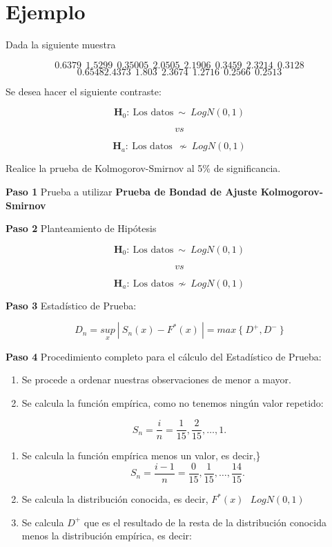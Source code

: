 \documentclass[
  a4paper,
  oneside,
  openany]{book}
\begin{document}
\hypertarget{ejemplo-14}{%
\section{Ejemplo}\label{ejemplo-14}}

Dada la siguiente muestra

\[0.6379 \ \ 1.5299 \ \ 0.35005 \ \ 2.0505 \ \ 2.1906 \ \ 0.3459 \ \ 2.3214 \ \ 0.3128\]
\[ 0.65482.4373 \ \ 1.803 \ \ 2.3674 \ \ 1.2716 \ \ 0.2566 \ \ 0.2513\]

Se desea hacer el siguiente contraste:

\[\textbf{H}_0: \ \mbox{Los datos} \  \sim  \ LogN(0,1)\]

\[vs\]

\[\textbf{H}_a: \ \mbox{Los datos} \ \ \nsim \ LogN(0,1)\]

Realice la prueba de Kolmogorov-Smirnov al 5\% de significancia.

\textbf{Paso 1} Prueba a utilizar \textbf{Prueba de Bondad de Ajuste Kolmogorov-Smirnov}

\textbf{Paso 2} Planteamiento de Hipótesis

\[\textbf{H}_0: \ \mbox{Los datos} \ \sim  \ LogN(0,1)\]

\[vs\]

\[\textbf{H}_a: \ \mbox{Los datos} \  \nsim \  LogN(0,1)\]

\textbf{Paso 3} Estadístico de Prueba:

\[D_{n}=\underset{x}{sup} \ | \ S_{n}(x)-F^*(x) \ |=max \ \{\ D^+,D^- \ \}\]

\textbf{Paso 4} Procedimiento completo para el cálculo del Estadístico de Prueba:

\begin{enumerate}
\def\labelenumi{\arabic{enumi})}
\item
  Se procede a ordenar nuestras observaciones de menor a mayor.
\item
  Se calcula la función empírica, como no tenemos ningún valor repetido:
\end{enumerate}

\[S_{n}= \frac{i}{n}=\frac{1}{15},\frac{2}{15}, \ldots, 1.\]

\begin{enumerate}
\def\labelenumi{\arabic{enumi})}
\setcounter{enumi}{2}
\item
  Se calcula la función empírica menos un valor, es decir,\}
  \[S_{n}= \frac{i-1}{n}=\frac{0}{15},\frac{1}{15}, \ldots, \frac{14}{15}.\]
\item
  Se calcula la distribución conocida, es decir, \(F^*(x) \ \ \  LogN(0,1)\)
\item
  Se calcula \(D^+\) que es el resultado de la resta de la distribución conocida menos la distribución empírica, es decir:
\end{enumerate}
\end{document}
